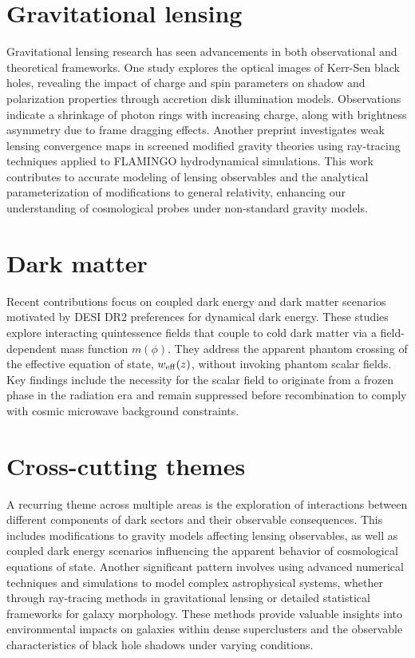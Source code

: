 \documentclass[11pt]{article}
\begin{document}
\section*{Gravitational lensing}
Gravitational lensing research has seen advancements in both observational and theoretical frameworks. One study explores the optical images of Kerr-Sen black holes, revealing the impact of charge and spin parameters on shadow and polarization properties through accretion disk illumination models. Observations indicate a shrinkage of photon rings with increasing charge, along with brightness asymmetry due to frame dragging effects.
Another preprint investigates weak lensing convergence maps in screened modified gravity theories using ray-tracing techniques applied to FLAMINGO hydrodynamical simulations. This work contributes to accurate modeling of lensing observables and the analytical parameterization of modifications to general relativity, enhancing our understanding of cosmological probes under non-standard gravity models.
\section*{Dark matter}
Recent contributions focus on coupled dark energy and dark matter scenarios motivated by DESI DR2 preferences for dynamical dark energy. These studies explore interacting quintessence fields that couple to cold dark matter via a field-dependent mass function $m(\phi )$. They address the apparent phantom crossing of the effective equation of state, $w_{\rm eff}(z)$, without invoking phantom scalar fields. Key findings include the necessity for the scalar field to originate from a frozen phase in the radiation era and remain suppressed before recombination to comply with cosmic microwave background constraints.
\section*{Cross-cutting themes}
A recurring theme across multiple areas is the exploration of interactions between different components of dark sectors and their observable consequences. This includes modifications to gravity models affecting lensing observables, as well as coupled dark energy scenarios influencing the apparent behavior of cosmological equations of state.
Another significant pattern involves using advanced numerical techniques and simulations to model complex astrophysical systems, whether through ray-tracing methods in gravitational lensing or detailed statistical frameworks for galaxy morphology. These methods provide valuable insights into environmental impacts on galaxies within dense superclusters and the observable characteristics of black hole shadows under varying conditions.
\end{document}
